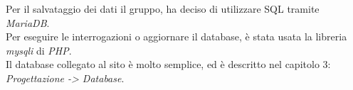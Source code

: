 ﻿Per il salvataggio dei dati il gruppo, ha deciso di utilizzare SQL tramite \emph{MariaDB}.\\
Per eseguire le interrogazioni o aggiornare il database, è stata usata la libreria \emph{mysqli} di \emph{PHP}.\\
Il database collegato al sito è molto semplice, ed è descritto nel capitolo 3: \emph{Progettazione -> Database}.
